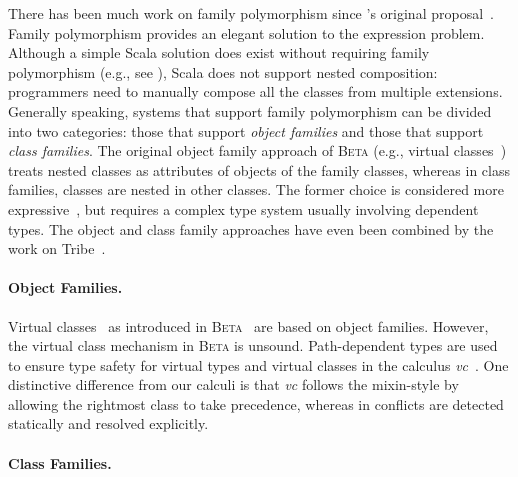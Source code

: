 There has been much work on family polymorphism since \citeauthor{Ernst_2001}'s
original proposal~\citep{Ernst_2001}. Family polymorphism provides an elegant
solution to the expression problem. Although a simple Scala solution does exist
without requiring family polymorphism (e.g., see \citet{wang2016expression}), Scala does not support nested composition:
programmers need to manually compose all the classes from multiple extensions.
Generally speaking, systems that support family polymorphism can be divided into
two categories: those that support \textit{object families} and those that
support \textit{class families}. The original object family approach of
\textsc{Beta }(e.g., virtual classes~\citep{Madsen_1989}) treats nested classes as
attributes of objects of the family classes, whereas in class families,
classes are nested in other classes. The former choice is considered more
expressive~\citep{ErnstVirtual}, but requires a complex type system usually
involving dependent types. The object and class family approaches have even been
combined by the work on Tribe~\citep{pubsdoc:tribe-virtual-calculus}.

\paragraph{Object Families.}

Virtual classes~\citep{Madsen_1989} as introduced in
\textsc{Beta}~\citep{LehrmannMadsen:1993:OPB:221048} are based on object
families. However, the virtual class mechanism in \textsc{Beta} is unsound.
Path-dependent types are used to ensure type safety for virtual types and
virtual classes in the calculus \textit{vc}~\citep{ErnstVirtual}. One distinctive
difference from our calculi is that \textit{vc} follows the mixin-style by
allowing the rightmost class to take precedence, whereas in \namee conflicts are
detected statically and resolved explicitly.

\paragraph{Class Families.}

